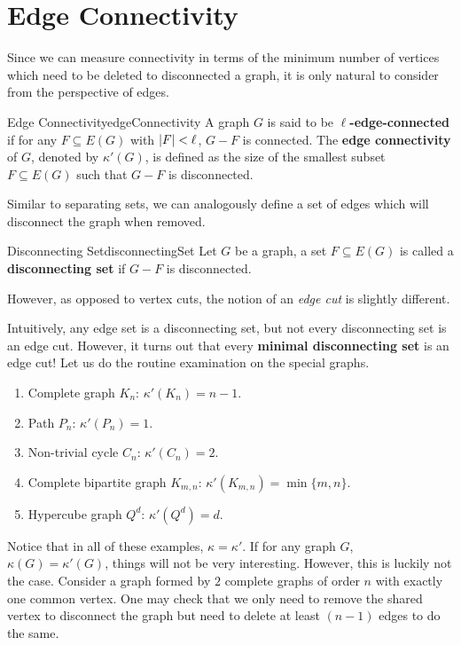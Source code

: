 \documentclass[math]{amznotes}
\makeatletter
\let\save@mathaccent\mathaccent
\newcommand*\if@single[3]{%
  \setbox0\hbox{${\mathaccent"0362{#1}}^H$}%
  \setbox2\hbox{${\mathaccent"0362{\kern0pt#1}}^H$}%
  \ifdim\ht0=\ht2 #3\else #2\fi
  }
\newcommand*\rel@kern[1]{\kern#1\dimexpr\macc@kerna}
\newcommand*\widebar[1]{\@ifnextchar^{{\wide@bar{#1}{0}}}{\wide@bar{#1}{1}}}
\newcommand*\wide@bar[2]{\if@single{#1}{\wide@bar@{#1}{#2}{1}}{\wide@bar@{#1}{#2}{2}}}
\newcommand*\wide@bar@[3]{%
  \begingroup
  \def\mathaccent##1##2{%
    \let\mathaccent\save@mathaccent
    \if#32 \let\macc@nucleus\first@char \fi
    \setbox\z@\hbox{$\macc@style{\macc@nucleus}_{}$}%
    \setbox\tw@\hbox{$\macc@style{\macc@nucleus}{}_{}$}%
    \dimen@\wd\tw@
    \advance\dimen@-\wd\z@
    \divide\dimen@ 3
    \@tempdima\wd\tw@
    \advance\@tempdima-\scriptspace
    \divide\@tempdima 10
    \advance\dimen@-\@tempdima
    \ifdim\dimen@>\z@ \dimen@0pt\fi
    \rel@kern{0.6}\kern-\dimen@
    \if#31
      \overline{\rel@kern{-0.6}\kern\dimen@\macc@nucleus\rel@kern{0.4}\kern\dimen@}%
      \advance\dimen@0.4\dimexpr\macc@kerna
      \let\final@kern#2%
      \ifdim\dimen@<\z@ \let\final@kern1\fi
      \if\final@kern1 \kern-\dimen@\fi
    \else
      \overline{\rel@kern{-0.6}\kern\dimen@#1}%
    \fi
  }%
  \macc@depth\@ne
  \let\math@bgroup\@empty \let\math@egroup\macc@set@skewchar
  \mathsurround\z@ \frozen@everymath{\mathgroup\macc@group\relax}%
  \macc@set@skewchar\relax
  \let\mathaccentV\macc@nested@a
  \if#31
    \macc@nested@a\relax111{#1}%
  \else
    \def\gobble@till@marker##1\endmarker{}%
    \futurelet\first@char\gobble@till@marker#1\endmarker
    \ifcat\noexpand\first@char A\else
      \def\first@char{}%
    \fi
    \macc@nested@a\relax111{\first@char}%
  \fi
  \endgroup
}
\theoremstyle{remark}
\newcommand{\0}{\mathbf{0}}
\newcommand{\1}{\mathbf{1}}
\makeatother
\begin{document}
\section{Edge Connectivity}
Since we can measure connectivity in terms of the minimum number of vertices which need to be deleted to disconnected a graph, it is only natural to consider from the perspective of edges.
\begin{dfnbox}{Edge Connectivity}{edgeConnectivity}
    A graph $G$ is said to be {\color{red} \textbf{$\ell$-edge-connected}} if for any $F \subseteq E(G)$ with ${\left\lvert {F} \right\rvert} < \ell$, $G - F$ is connected. The {\color{red} \textbf{edge connectivity}} of $G$, denoted by $\kappa'(G)$, is defined as the size of the smallest subset $F \subseteq E(G)$ such that $G - F$ is disconnected.
\end{dfnbox}
Similar to separating sets, we can analogously define a set of edges which will disconnect the graph when removed.
\begin{dfnbox}{Disconnecting Set}{disconnectingSet}
    Let $G$ be a graph, a set $F \subseteq E(G)$ is called a {\color{red} \textbf{disconnecting set}} if $G - F$ is disconnected.
\end{dfnbox}
However, as opposed to vertex cuts, the notion of an \textit{edge cut} is slightly different.
Intuitively, any edge set is a disconnecting set, but not every disconnecting set is an edge cut. However, it turns out that every \textbf{minimal disconnecting set} is an edge cut! Let us do the routine examination on the special graphs.
\begin{enumerate}
    \item Complete graph $K_n$: $\kappa'(K_n) = n - 1$.
    \item Path $P_n$: $\kappa'(P_n) = 1$.
    \item Non-trivial cycle $C_n$: $\kappa'(C_n) = 2$.
    \item Complete bipartite graph $K_{m, n}$: $\kappa'(K_{m, n}) = \min\{m, n\}$.
    \item Hypercube graph $Q^d$: $\kappa'\left(Q^d\right) = d$.
\end{enumerate}
Notice that in all of these examples, $\kappa = \kappa'$. If for any graph $G$, $\kappa(G) = \kappa'(G)$, things will not be very interesting. However, this is luckily not the case. Consider a graph formed by $2$ complete graphs of order $n$ with exactly one common vertex. One may check that we only need to remove the shared vertex to disconnect the graph but need to delete at least $(n - 1)$ edges to do the same.
\end{document}
